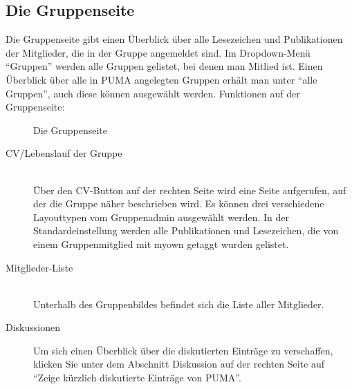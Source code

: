 \subsection{Die Gruppenseite}
\label{subsec:gruppenseite}
Die Gruppenseite  gibt einen Überblick über alle Lesezeichen und Publikationen der Mitglieder, die in der Gruppe angemeldet sind. Im Dropdown-Menü \enquote{Gruppen} werden alle Gruppen gelistet, bei denen man Mitlied ist. Einen Überblick über alle in PUMA angelegten Gruppen erhält man unter \enquote{alle Gruppen}, auch diese können ausgewählt werden.%
\newline\newline
Funktionen auf der Gruppenseite:
\begin{figure}[h!]
 \centering
 \caption{Die Gruppenseite}
 \label{fig:gruppenseite}
\end{figure}
\begin{description}
\item [CV/Lebenslauf der Gruppe] \hfill \\
Über den CV-Button auf der rechten Seite wird eine Seite aufgerufen, auf der die Gruppe näher beschrieben wird. Es können drei verschiedene Layouttypen vom Gruppenadmin ausgewählt werden. In der Standardeinstellung werden alle Publikationen und Lesezeichen, die von einem Gruppenmitglied mit myown getaggt wurden gelistet. 
\item [Mitglieder-Liste] \hfill \\
Unterhalb des Gruppenbildes befindet sich die Liste aller Mitglieder. 
\item [Diskussionen] Um sich einen Überblick über die diskutierten Einträge zu verschaffen, klicken Sie unter dem Abschnitt Diskussion auf der rechten Seite auf \enquote{Zeige kürzlich diskutierte Einträge von PUMA}. 
\end{description}
